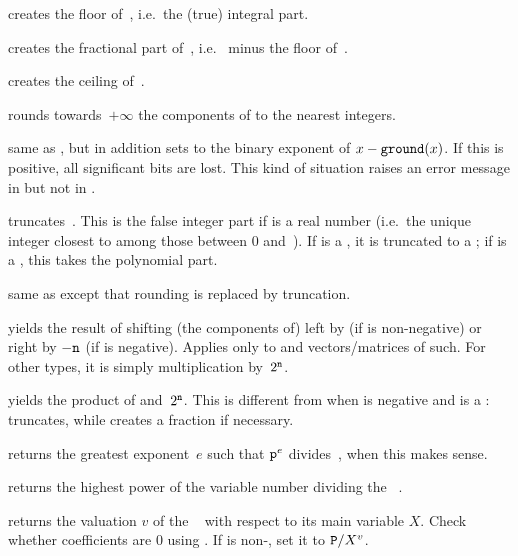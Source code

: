 
 creates the floor of~, i.e.\ the (true)
integral part.

 creates the fractional part of~, i.e.\ 
minus the floor of~.

 creates the ceiling of~.

 rounds towards~$+\infty$ the components of 
to the nearest integers.

 same as , but in addition sets
 to the binary exponent of $x - {\tt ground}(x)$. If this is
positive, all significant bits are lost. This kind of situation raises an
error message in  but not in .

 truncates~. This is the false integer part
if  is a real number (i.e.~the unique integer closest to  among
those between 0 and~). If  is a , it is truncated
to a ; if  is a , this takes the polynomial part.

 same as  except that
rounding is replaced by truncation.


 yields the result of shifting
(the components of)  left by  (if  is non-negative)
or right by $-{\tt n}$ (if  is negative). Applies only to 
and vectors/matrices of such. For other types, it is simply multiplication
by~$2^{{\tt n}}$.

 yields the product of 
and~$2^{{\tt n}}$. This is different from  when  is negative
and  is a :  truncates, while 
creates a fraction if necessary.

 returns the greatest exponent~$e$ such that
${\tt p}^e$ divides~, when this makes sense.

 returns the highest power of the variable
number  dividing the ~.

 returns the valuation $v$ of the
~ with respect to its main variable $X$. Check whether
coefficients are $0$ using . If  is non-, set it
to ${\tt P} / X^v$.

